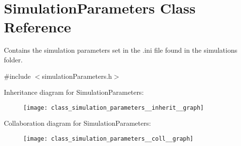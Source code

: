 \hypertarget{class_simulation_parameters}{}\section{Simulation\+Parameters Class Reference}
\label{class_simulation_parameters}


Contains the simulation parameters set in the .ini file found in the simulations folder.  




{\ttfamily \#include $<$simulation\+Parameters.\+h$>$}



Inheritance diagram for Simulation\+Parameters\+:\nopagebreak
\begin{figure}[H]
\begin{center}
\leavevmode
\texttt{[image: class\_simulation\_parameters\_\_inherit\_\_graph]}
\end{center}
\end{figure}


Collaboration diagram for Simulation\+Parameters\+:\nopagebreak
\begin{figure}[H]
\begin{center}
\leavevmode
\texttt{[image: class\_simulation\_parameters\_\_coll\_\_graph]}
\end{center}
\end{figure}
